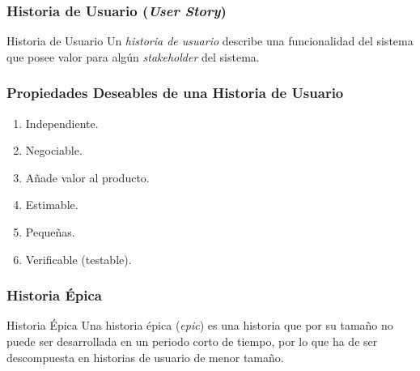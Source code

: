 \documentclass[animated,a4paper,slidestop,xcolor=pst,blue]{beamer}
\begin{document}
\begin{frame}[c]
	\frametitle{Historia de Usuario (\emph{User Story})}
	\begin{block}{Historia de Usuario}
        Un \emph{historia de usuario} describe una funcionalidad del sistema que posee valor para algún \emph{stakeholder} del sistema.
	\end{block}
\end{frame}

\begin{frame}[c]
	\frametitle{Propiedades Deseables de una Historia de Usuario}
	\begin{enumerate}[<+->]
		\item Independiente.
        \item Negociable.
        \item Añade valor al producto.
        \item Estimable.
        \item Pequeñas.
        \item Verificable (testable).
	\end{enumerate}
\end{frame}

\begin{frame}[c]
	\frametitle{Historia Épica}
	\begin{block}{Historia Épica}
        Una historia épica (\emph{epic}) es una historia que por su tamaño no puede ser desarrollada en un periodo corto de tiempo, por lo que ha de ser descompuesta en historias de usuario de menor tamaño.
	\end{block}
\end{frame}
\end{document}

